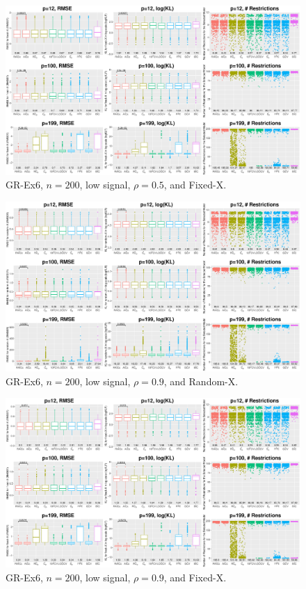 \begin{figure}[!ht]
\centering
\includegraphics[width=\textwidth]{figures/supplement/fixedx_GR-Ex6_n200_lsnr_rho05.eps}
\caption{GR-Ex6, $n=200$, low signal, $\rho=0.5$, and Fixed-X.}
\end{figure}
\clearpage
\begin{figure}[!ht]
\centering
\includegraphics[width=\textwidth]{figures/supplement/randomx_GR-Ex6_n200_lsnr_rho09.eps}
\caption{GR-Ex6, $n=200$, low signal, $\rho=0.9$, and Random-X.}
\end{figure}
\begin{figure}[!ht]
\centering
\includegraphics[width=\textwidth]{figures/supplement/fixedx_GR-Ex6_n200_lsnr_rho09.eps}
\caption{GR-Ex6, $n=200$, low signal, $\rho=0.9$, and Fixed-X.}
\end{figure}
